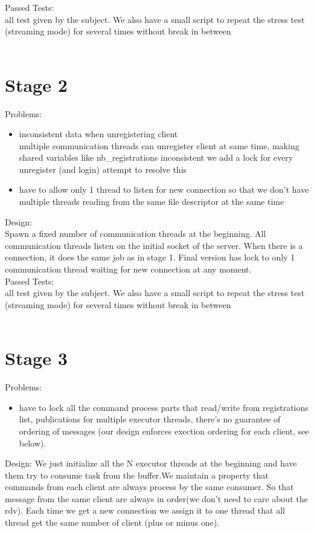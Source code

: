\documentclass{article}
\begin{document}
Passed Tests:\\
all test given by the subject. We also have a small script to repeat the stress test (streaming mode) for several times without break in between \\\\
\section{Stage 2}
Problems:
\begin{itemize}
\item inconsistent data when unregistering client\\
multiple communication threads can unregister client at same time, making shared variables like nb\_registrations inconsistent
we add a lock for every unregister (and login) attempt to resolve this
\item have to allow only 1 thread to listen for new connection so that we don't have multiple threads reading from the same file descriptor at the same time
\end{itemize}

Design:\\
Spawn a fixed number of communication threads at the beginning.
All communication threads listen on the initial socket of the server. When there is a connection, it does the same job as in stage 1.
Final version has lock to only 1 communication thread waiting for new connection at any moment.
\\
Passed Tests:\\
all test given by the subject. We also have a small script to repeat the stress test (streaming mode) for several times without break in between \\\\

\section{Stage 3}

Problems:
\begin{itemize}
\item have to lock all the command process parts that read/write from registrations list, publications
for multiple executor threads, there's no guarantee of ordering of messages (our design enforces exection ordering for each client, see below).
\end{itemize}

Design:
We just initialize all the N executor threads at the beginning and have them try to consume task from the buffer.We maintain a property that commands from each client are always process by the same consumer. So that message from the same client are always in order(we don't need to care about the rdv). 
Each time we get a new connection we assign it to one thread that all thread get the same number of client (plus or minus one).
\end{document}
